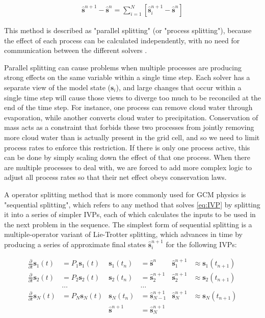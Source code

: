 \documentclass [11pt, proquest] {uwthesis}[2020/02/24]
\begin{document}
\begin{align}
    \hat{\mathbf{s}}^{n+1} - \hat{\mathbf{s}}^n = \sum_{i=1}^{N} \left[\hat{\mathbf{s}}^{n+1}_i - \hat{\mathbf{s}}^n\right]
\end{align}

This method is described as "parallel splitting" (or "process splitting"), because the effect of each process can be calculated independently, with no need for communication between the different solvers \parencite{Beljaars2004}.

Parallel splitting can cause problems when multiple processes are producing strong effects on the same variable within a single time step. Each solver has a separate view of the model state ($\mathbf{s}_i$), and large changes that occur within a single time step will cause those views to diverge too much to be reconciled at the end of the time step. For instance, one process can remove cloud water through evaporation, while another converts cloud water to precipitation. Conservation of mass acts as a constraint that forbids these two processes from jointly removing more cloud water than is actually present in the grid cell, and so we need to limit process rates to enforce this restriction. If there is only one process active, this can be done by simply scaling down the effect of that one process. When there are multiple processes to deal with, we are forced to add more complex logic to adjust all process rates so that their net effect obeys conservation laws.

A operator splitting method that is more commonly used for GCM physics is "sequential splitting", which refers to any method that solves \eqref{eq:IVP} by splitting it into a series of simpler IVPs, each of which calculates the inputs to be used in the next problem in the sequence. The simplest form of sequential splitting is a multiple-operator variant of Lie-Trotter splitting, which advances in time by producing a series of approximate final states $\hat{\mathbf{s}}^{n+1}_i$ for the following IVPs:

\begin{align}
    \frac{\partial}{\partial t} \mathbf{s}_1(t) &= P_1 \mathbf{s}_1(t) & \mathbf{s}_1(t_n) &= \hat{\mathbf{s}}^n & \hat{\mathbf{s}}^{n+1}_1 &\approx \mathbf{s}_1(t_{n+1}) \label{eq:IVP-1} \\
    \frac{\partial}{\partial t} \mathbf{s}_2(t) &= P_2 \mathbf{s}_2(t) & \mathbf{s}_2(t_n) &= \hat{\mathbf{s}}^{n+1}_2 & \hat{\mathbf{s}}^{n+1}_2 &\approx \mathbf{s}_2(t_{n+1}) \label{eq:IVP-2} \\
    &\dots & &\dots \nonumber \\
    \frac{\partial}{\partial t} \mathbf{s}_N(t) &= P_N \mathbf{s}_N(t) & \mathbf{s}_N(t_n) &= \hat{\mathbf{s}}^{n+1}_{N-1} & \hat{\mathbf{s}}^{n+1}_N &\approx \mathbf{s}_N(t_{n+1}) \label{eq:IVP-N} \\
    & & \hat{\mathbf{s}}^{n+1} &= \hat{\mathbf{s}}^{n+1}_N & &
\end{align}
\end{document}
